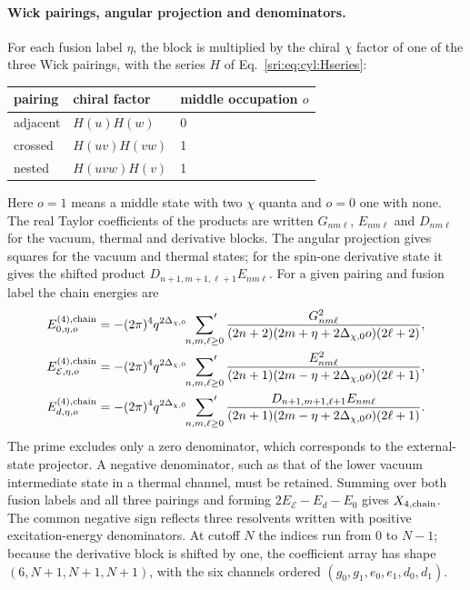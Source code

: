 \paragraph{Wick pairings, angular projection and denominators.} For each fusion label $\eta$, the block is multiplied
by the chiral $\chi$ factor of one of the three Wick pairings, with the series $H$ of Eq.~\eqref{sri:eq:cyl:Hseries}:
\begin{center}\small
\begin{tabular}{@{}lll@{}}
\toprule
pairing & chiral factor & middle occupation $o$\\
\midrule
adjacent & $H(u)H(w)$ & 0\\
crossed & $H(uv)H(vw)$ & 1\\
nested & $H(uvw)H(v)$ & 1\\
\bottomrule
\end{tabular}
\end{center}
Here $o=1$ means a middle state with two $\chi$ quanta and $o=0$ one with none. The real Taylor coefficients of the
products are written $G_{nm\ell}$, $E_{nm\ell}$ and $D_{nm\ell}$ for the vacuum, thermal and derivative blocks. The
angular projection gives squares for the vacuum and thermal states; for the spin-one derivative state it gives the
shifted product $D_{n+1,m+1,\ell+1}E_{nm\ell}$. For a given pairing and fusion label the chain energies are
\begin{equation}
\begin{aligned}
 E_{0,\eta,o}^{(4),\rm chain}&=-(2\pi)^4q^{2\Delta_{\chi,0}}\sideset{}{'}\sum_{n,m,\ell\ge0}
 \frac{G_{nm\ell}^2}{(2n+2)(2m+\eta+2\Delta_{\chi,0}o)(2\ell+2)},\\
 E_{\mathcal E,\eta,o}^{(4),\rm chain}&=-(2\pi)^4q^{2\Delta_{\chi,0}}\sideset{}{'}\sum_{n,m,\ell\ge0}
 \frac{E_{nm\ell}^2}{(2n+1)(2m-\eta+2\Delta_{\chi,0}o)(2\ell+1)},\\
 E_{d,\eta,o}^{(4),\rm chain}&=-(2\pi)^4q^{2\Delta_{\chi,0}}\sideset{}{'}\sum_{n,m,\ell\ge0}
 \frac{D_{n+1,m+1,\ell+1}E_{nm\ell}}{(2n+1)(2m-\eta+2\Delta_{\chi,0}o)(2\ell+1)}.
\end{aligned}
\label{sri:eq:cyl:chain}
\end{equation}
The prime excludes only a zero denominator, which corresponds to the external-state projector. A negative denominator,
such as that of the lower vacuum intermediate state in a thermal channel, must be retained. Summing over both fusion
labels and all three pairings and forming $2E_{\mathcal E}-E_d-E_0$ gives $X_{4,\rm chain}$. The common negative sign
reflects three resolvents written with positive excitation-energy denominators. At cutoff $N$ the indices run from 0 to
$N-1$; because the derivative block is shifted by one, the coefficient array has shape $(6,N+1,N+1,N+1)$, with the six
channels ordered $(g_0,g_1,e_0,e_1,d_0,d_1)$.

